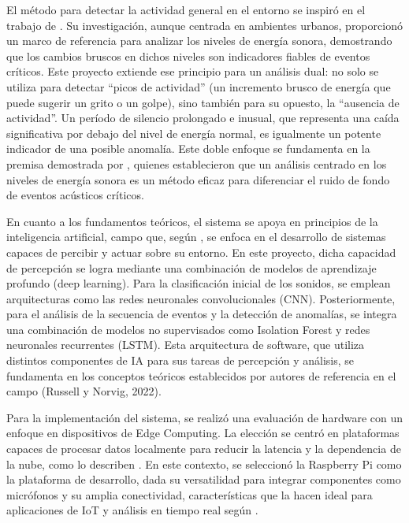 El método para detectar la actividad general en el entorno se inspiró en el trabajo de \citeauthor{torija_metodologia_2018} \citeyear{torija_metodologia_2018}. Su investigación, aunque centrada en ambientes urbanos, proporcionó un marco de referencia para analizar los niveles de energía sonora, demostrando que los cambios bruscos en dichos niveles son indicadores fiables de eventos críticos. Este proyecto extiende ese principio para un análisis dual: no solo se utiliza para detectar ``picos de actividad'' (un incremento brusco de energía que puede sugerir un grito o un golpe), sino también para su opuesto, la ``ausencia de actividad''. Un período de silencio prolongado e inusual, que representa una caída significativa por debajo del nivel de energía normal, es igualmente un potente indicador de una posible anomalía. Este doble enfoque se fundamenta en la premisa demostrada por \citeauthor{torija_metodologia_2018} \citeyear{torija_metodologia_2018}, quienes establecieron que un análisis centrado en los niveles de energía sonora es un método eficaz para diferenciar el ruido de fondo de eventos acústicos críticos.

En cuanto a los fundamentos teóricos, el sistema se apoya en principios de la inteligencia artificial, campo que, según \citeauthor{russell_artificial_2022} \citeyear{russell_artificial_2022}, se enfoca en el desarrollo de sistemas capaces de percibir y actuar sobre su entorno. En este proyecto, dicha capacidad de percepción se logra mediante una combinación de modelos de aprendizaje profundo (deep learning). Para la clasificación inicial de los sonidos, se emplean arquitecturas como las redes neuronales convolucionales (CNN). Posteriormente, para el análisis de la secuencia de eventos y la detección de anomalías, se integra una combinación de modelos no supervisados como Isolation Forest y redes neuronales recurrentes (LSTM). Esta arquitectura de software, que utiliza distintos componentes de IA para sus tareas de percepción y análisis, se fundamenta en los conceptos teóricos establecidos por autores de referencia en el campo (Russell y Norvig, 2022).


Para la implementación del sistema, se realizó una evaluación de hardware con un enfoque en dispositivos de Edge Computing. La elección se centró en plataformas capaces de procesar datos localmente para reducir la latencia y la dependencia de la nube, como lo describen \citeauthor{shi_edge_2016} \citeyear{shi_edge_2016}. En este contexto, se seleccionó la Raspberry Pi como la plataforma de desarrollo, dada su versatilidad para integrar componentes como micrófonos y su amplia conectividad, características que la hacen ideal para aplicaciones de IoT y análisis en tiempo real según \citeauthor{richardson_getting_2016} \citeyear{richardson_getting_2016}.

